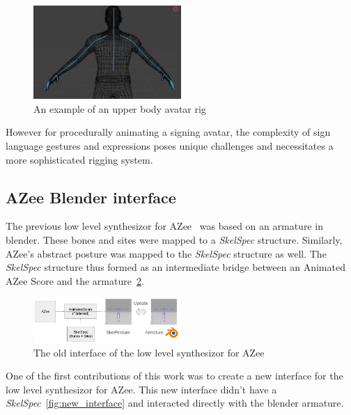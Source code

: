 \documentclass[../../main.tex]{subfiles}
\begin{document}
\begin{figure}[h]
    \centering
    \includegraphics[width=0.5\textwidth]{chapters/rigging_layers/images/upper_body_avatar.png}
    \caption{An example of an upper body avatar rig}
    \label{ref:upper_body_avatar}
\end{figure}

However for procedurally animating a signing avatar, the complexity of sign language gestures and expressions poses unique challenges and necessitates a more sophisticated rigging system.

\subsection{AZee Blender interface}
\label{ch:rigging_layers:proc_rig_signing_avatars:azee_blender_interface}

The previous low level synthesizor for AZee~\cite{fabrizio} was based on an armature in blender. These bones and sites were mapped to a \emph{SkelSpec} structure. Similarly, AZee's abstract posture was mapped to the \emph{SkelSpec} structure as well. The \emph{SkelSpec} structure thus formed as an intermediate bridge between an Animated AZee Score and the armature~\ref{fig:old_interface}. 

\begin{figure}
    \centering
    \includegraphics[width=0.5\textwidth]{chapters/rigging_layers/images/old_interface.png}
    \caption{The old interface of the low level synthesizor for AZee}
    \label{fig:old_interface}
\end{figure}

One of the first contributions of this work was to create a new interface for the low level synthesizor for AZee. This new interface didn't have a \emph{SkelSpec}~\ref{fig:new_interface} and interacted directly with the blender armature. 
\end{document}
